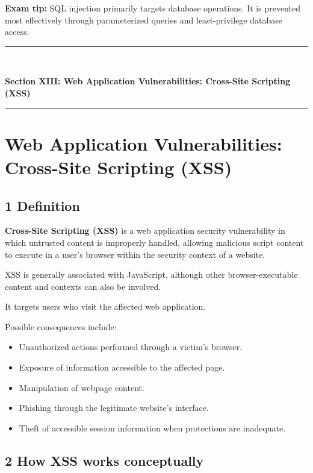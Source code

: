 \textbf{Exam tip:} SQL injection primarily targets database operations. It is prevented most effectively through parameterized queries and least-privilege database access.


\newpage
\begin{center}
\vspace{0.5em}
{\color{primary}\rule{0.45\textwidth}{1.2pt}\\[4pt]}
{\Large\bfseries\color{primary} Section XIII: Web Application Vulnerabilities: Cross-Site Scripting (XSS)\\[2pt]}
{\color{primary}\rule{0.45\textwidth}{1.2pt}}
\vspace{0.5em}
\end{center}

\section{Web Application Vulnerabilities: Cross-Site Scripting (XSS)}


\subsection{1 Definition}

\textbf{Cross-Site Scripting (XSS)} is a web application security vulnerability in which untrusted content is improperly handled, allowing malicious script content to execute in a user's browser within the security context of a website.

XSS is generally associated with JavaScript, although other browser-executable content and contexts can also be involved.

It targets users who visit the affected web application.

Possible consequences include:

\begin{itemize}
\item Unauthorized actions performed through a victim's browser.
\item Exposure of information accessible to the affected page.
\item Manipulation of webpage content.
\item Phishing through the legitimate website's interface.
\item Theft of accessible session information when protections are inadequate.
\end{itemize}

\subsection{2 How XSS works conceptually}

